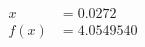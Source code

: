 \documentclass[preview]{standalone}
\begin{document}
\begin{align*}
x &= 0.0272\\f(x) &= 4.0549540
\end{align*}
\end{document}

